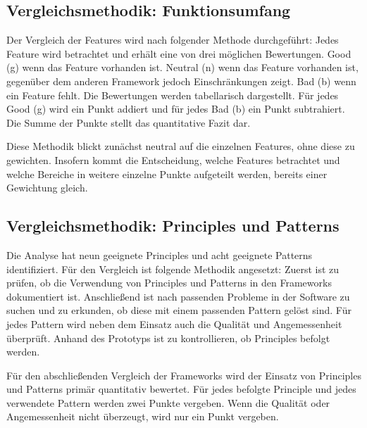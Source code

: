 \newpage

\subsection{Vergleichsmethodik: Funktionsumfang}
Der Vergleich der Features wird nach folgender Methode durchgeführt:
Jedes Feature wird betrachtet und erhält eine von drei möglichen Bewertungen.
Good (g) wenn das Feature vorhanden ist.
Neutral (n) wenn das Feature vorhanden ist, gegenüber dem anderen Framework jedoch Einschränkungen zeigt.
Bad (b) wenn ein Feature fehlt.
Die Bewertungen werden tabellarisch dargestellt.
Für jedes Good (g) wird ein Punkt addiert und für jedes Bad (b) ein Punkt subtrahiert.
Die Summe der Punkte stellt das quantitative Fazit dar.

Diese Methodik blickt zunächst neutral auf die einzelnen Features, ohne diese zu gewichten.
Insofern kommt die Entscheidung, welche Features betrachtet und welche Bereiche in weitere einzelne Punkte aufgeteilt werden, bereits einer Gewichtung gleich.

\subsection{Vergleichsmethodik: Principles und Patterns}
Die Analyse hat neun geeignete Principles und acht geeignete Patterns identifiziert.
Für den Vergleich ist folgende Methodik angesetzt:
Zuerst ist zu prüfen, ob die Verwendung von Principles und Patterns in den Frameworks dokumentiert ist.
Anschließend ist nach passenden Probleme in der Software zu suchen und zu erkunden, ob diese mit einem passenden Pattern gelöst sind.
Für jedes Pattern wird neben dem Einsatz auch die Qualität und Angemessenheit überprüft.
Anhand des Prototyps ist zu kontrollieren, ob Principles befolgt werden.

Für den abschließenden Vergleich der Frameworks wird der Einsatz von Principles und Patterns primär quantitativ bewertet.
Für jedes befolgte Principle und jedes verwendete Pattern werden zwei Punkte vergeben.
Wenn die Qualität oder Angemessenheit nicht überzeugt, wird nur ein Punkt vergeben.
